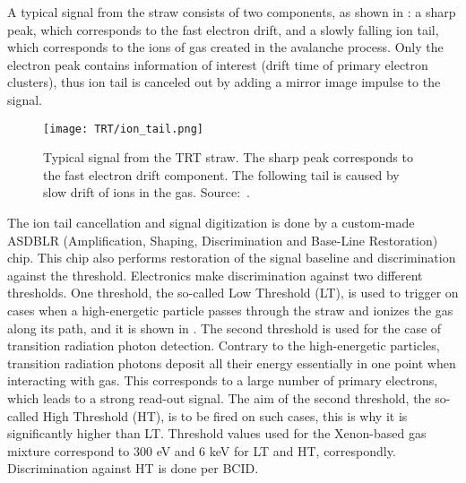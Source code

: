 
A typical signal from the straw consists of two components, as shown in : 
a sharp peak, which corresponds to the fast electron drift, and a slowly falling ion tail, which corresponds to the ions of gas created in the avalanche process.
Only the electron peak contains information of interest (drift time of primary electron clusters), thus ion tail is canceled out by adding a mirror image impulse to the signal.

\begin{figure}
\centering
\texttt{[image: TRT/ion\_tail.png]}
\caption{ 
 Typical signal from the TRT straw. The sharp peak corresponds to the fast electron drift component.
 The following tail is caused by slow drift of ions in the gas.
 Source:~\cite{ID_TDR_vol2}.
}
\label{fig:ion_tail}
\end{figure}

The ion tail cancellation and signal digitization is done by a custom-made ASDBLR (Amplification, Shaping, Discrimination and Base-Line Restoration) chip. 
This chip also performs restoration of the signal baseline and discrimination against the threshold. 
Electronics make discrimination against two different thresholds. One threshold, the so-called Low Threshold (LT), 
is used to trigger on cases when a high-energetic particle passes through the straw and ionizes the gas along its path, and it is shown in .
The second threshold is used for the case of transition radiation photon detection.
Contrary to the high-energetic particles, transition radiation photons deposit all their energy essentially in one point when interacting with gas.
This corresponds to a large number of primary electrons, which leads to a strong read-out signal.
The aim of the second threshold, the so-called High Threshold (HT), is to be fired on such cases, this is why it is significantly higher than LT.
Threshold values used for the Xenon-based gas mixture correspond to 300 eV and 6 keV for LT and HT, correspondly.
Discrimination against HT is done per BCID. 

